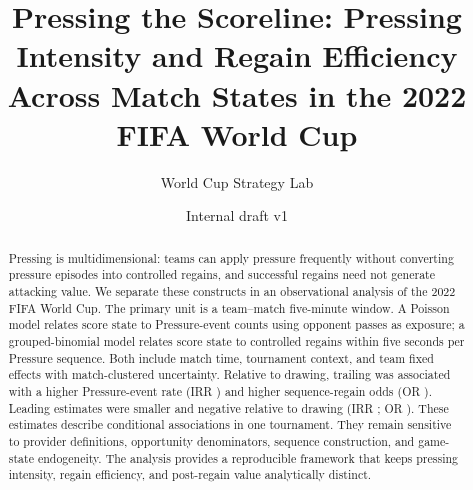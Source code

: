 \documentclass[11pt]{article}
\title{Pressing the Scoreline: Pressing Intensity and Regain Efficiency Across Match States in the 2022 FIFA World Cup}
\author{World Cup Strategy Lab}
\date{Internal draft v1}
\begin{document}
\maketitle
\begin{abstract}
Pressing is multidimensional: teams can apply pressure frequently without converting pressure episodes into controlled regains, and successful regains need not generate attacking value. We separate these constructs in an observational analysis of the 2022 FIFA World Cup. The primary unit is a team--match five-minute window. A Poisson model relates score state to Pressure-event counts using opponent passes as exposure; a grouped-binomial model relates score state to controlled regains within five seconds per Pressure sequence. Both include match time, tournament context, and team fixed effects with match-clustered uncertainty. Relative to drawing, trailing was associated with a higher Pressure-event rate (IRR \IntensityTrailingEffect) and higher sequence-regain odds (OR \EfficiencyTrailingEffect). Leading estimates were smaller and negative relative to drawing (IRR \IntensityLeadingEffect; OR \EfficiencyLeadingEffect). These estimates describe conditional associations in one tournament. They remain sensitive to provider definitions, opportunity denominators, sequence construction, and game-state endogeneity. The analysis provides a reproducible framework that keeps pressing intensity, regain efficiency, and post-regain value analytically distinct.
\end{abstract}











\end{document}
